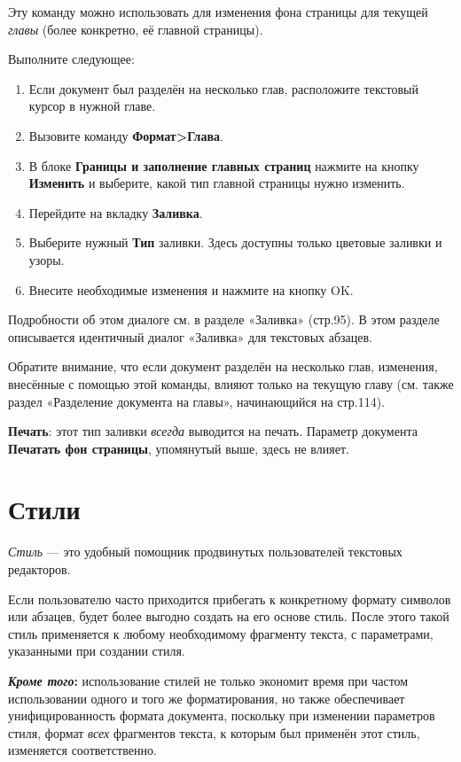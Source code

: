 \documentclass[a4paper,10pt]{article}
\begin{document}
Эту команду можно использовать для изменения фона страницы для текущей \textit{главы} (более конкретно, её главной страницы).

Выполните следующее:
\begin{enumerate}
 \item Если документ был разделён на несколько глав, расположите текстовый курсор в нужной главе.
 \item Вызовите команду \textbf{Формат>Глава}.
 \item В блоке \textbf{Границы и заполнение главных страниц} нажмите на кнопку \textbf{Изменить} и выберите, какой тип главной страницы нужно изменить.
 \item Перейдите на вкладку \textbf{Заливка}.
 \item Выберите нужный \textbf{Тип} заливки. Здесь доступны только цветовые заливки и узоры.
 \item Внесите необходимые изменения и нажмите на кнопку OK.
\end{enumerate}

Подробности об этом диалоге см. в разделе «Заливка» (стр.95). В этом разделе описывается идентичный диалог «Заливка» для текстовых абзацев.

Обратите внимание, что если документ разделён на несколько глав, изменения, внесённые с помощью этой команды, влияют только на текущую главу (см. также раздел «Разделение документа на главы», начинающийся на стр.114).

\textbf{Печать}: этот тип заливки \textit{всегда} выводится на печать. Параметр документа \textbf{Печатать фон страницы}, упомянутый выше, здесь не влияет.

\section{Стили}
\textit{Стиль} --- это удобный помощник продвинутых пользователей текстовых редакторов.

Если пользователю часто приходится прибегать к конкретному формату символов или абзацев, будет более выгодно создать на его основе стиль. После этого такой стиль применяется к любому необходимому фрагменту текста, с параметрами, указанными при создании стиля.

\begin{mdframed}[backgroundcolor=blue!10]
\textbf{\textit{Кроме того}:} использование стилей не только экономит время при частом использовании одного и того же форматирования, но также обеспечивает унифицированность формата документа, поскольку при изменении параметров стиля, формат \textit{всех} фрагментов текста, к которым был применён этот стиль, изменяется соответственно.
\end{mdframed}
\end{document}
